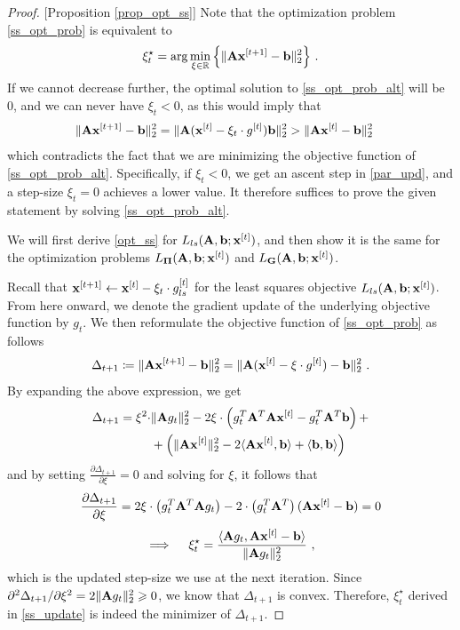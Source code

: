 \documentclass[journal,letterpaper,onecolumn,twoside,nofonttune]{IEEEtran}
\newcommand{\xb}{\bold{x}}
\newcommand{\Gb}{\bold{G}}
\newcommand{\Pibold}{\bold{\Pi}}
\newcommand{\R}{\mathbb{R}}
\newcommand{\Ab}{\bold{A}}
\newcommand{\bb}{\bold{b}}
\begin{document}
\begin{proof}{[Proposition \ref{prop_opt_ss}]}
Note that the optimization problem \eqref{ss_opt_prob} is equivalent to
\begin{equation}
\label{ss_opt_prob_alt}  %
  \xi_t^{\star} = \arg\min_{\xi\in\R}\Big\{\|\Ab\xb^{[t+1]}-\bb\|_2^2\Big\}\ .
\end{equation}
If we cannot decrease further, the optimal solution to \eqref{ss_opt_prob_alt} will be 0, and we can never have $\xi_{t}<0$, as this would imply that
\begin{align*}
  \|\Ab\xb^{[t+1]}-\bb\|_2^2 &= \|\Ab(\xb^{[t]}-\xi_t\cdot g^{[t]})\bb\|_2^2 > \|\Ab\xb^{[t]}-\bb\|_2^2
\end{align*}
which contradicts the fact that we are minimizing the objective function of \eqref{ss_opt_prob_alt}. Specifically, if $\xi_t<0$, we get an ascent step in \eqref{par_upd}, and a step-size $\xi_t=0$ achieves a lower value. It therefore suffices to prove the given statement by solving \eqref{ss_opt_prob_alt}.

We will first derive \eqref{opt_ss} for $L_{ls}(\Ab,\bb;\xb^{[t]})$, and then show it is the same for the optimization problems $L_{\Pibold}(\Ab,\bb;\xb^{[t]})$ and $L_{\Gb}(\Ab,\bb;\xb^{[t]})$.
  
Recall that $\xb^{[t+1]}\gets\xb^{[t]}-\xi_t\cdot g_{ls}^{[t]}$ for the least squares objective $L_{ls}(\Ab,\bb;\xb^{[t]})$. From here onward, we denote the gradient update of the underlying objective function by $g_t$. We then reformulate the objective function of \eqref{ss_opt_prob} as follows
$$ \Delta_{t+1} \coloneqq \|\Ab\xb^{[t+1]}-\bb\|_2^2=\|\Ab(\xb^{[t]}-\xi\cdot g^{[t]})-\bb\|_2^2\ . $$
By expanding the above expression, we get
\begin{align*}
  \Delta_{t+1} = \xi^2\cdot&\|\Ab g_t\|_2^2-2\xi\cdot\left(g_t^T\Ab^T\Ab\xb^{[t]}-g_t^T\Ab^T\bb\right) +\\
  &+ \left(\|\Ab\xb^{[t]}\|_2^2-2\langle\Ab\xb^{[t]},\bb\rangle+\langle\bb,\bb\rangle\right)
\end{align*}
and by setting $\frac{\partial\Delta_{t+1}}{\partial\xi}=0$ and solving for $\xi$, it follows that
$$ \frac{\partial\Delta_{t+1}}{\partial\xi} = 2\xi\cdot\left(g_t^T\Ab^T\Ab g_t\right)-2\cdot\left(g_t^T\Ab^T\right)(\Ab\xb^{[t]}-\bb) = 0 $$
\begin{equation}
\label{ss_update}
  \implies \quad \xi_t^{\star} = \frac{\langle\Ab g_t,\Ab\xb^{[t]}-\bb\rangle}{\|\Ab g_t\|_2^2}\ ,
\end{equation}
which is the updated step-size we use at the next iteration. Since $\partial^2\Delta_{t+1}/\partial\xi^2=2\|\Ab g_t\|_2^2\geqslant0$, we know that $\Delta_{t+1}$ is convex. Therefore, $\xi_t^{\star}$ derived in \eqref{ss_update} is indeed the minimizer of $\Delta_{t+1}$.


\end{proof}
\end{document}
